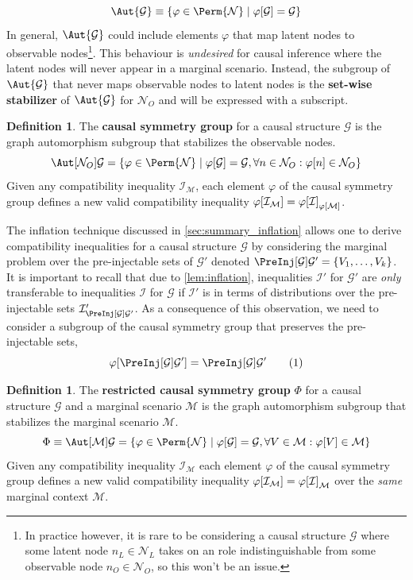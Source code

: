 \documentclass[aps, 10pt, english, twoside, pra, nofootinbib, longbibliography]{revtex4-1}
\theoremstyle{plain}
\theoremstyle{definition}
\newtheorem{definition}[theorem]{Definition}
\theoremstyle{remark}
\newcommand{\graph}{\mathcal{G}}
\newcommand{\nodes}{\mathcal{N}}
\newcommand{\gelem}{\varphi}
\newcommand{\action}[1]{\gelem\bs{#1}}
\newcommand{\mscenario}{\mathcal{M}}
\newcommand{\term}[1]{\textcolor{Mahogany}{\textbf{#1}}}
\begin{document}
    \[ \Aut{\graph} \defined \bc{\gelem \in \Perm{\nodes} \mid \action{\graph} = \graph} \]
    In general, $\Aut{\graph}$ could include elements $\gelem$ that map latent nodes to observable nodes\footnote{In practice however, it is rare to be considering a causal structure $\graph$ where some latent node $n_L \in \nodes_L$ takes on an role indistinguishable from some observable node $n_O \in \nodes_O$, so this won't be an issue.}. This behaviour is \textit{undesired} for causal inference where the latent nodes will never appear in a marginal scenario. Instead, the subgroup of $\Aut{\graph}$ that never maps observable nodes to latent nodes is the \term{set-wise stabilizer} of $\Aut{\graph}$ for $\nodes_O$ and will be expressed with a subscript.

    \begin{definition}
        The \term{causal symmetry group} for a causal structure $\graph$ is the graph automorphism subgroup that stabilizes the observable nodes.
        \[ \Aut[\nodes_O]{\graph} = \bc{\gelem \in \Perm{\nodes} \mid \action{\graph} = \graph, \forall n \in \nodes_O :\action{n} \in \nodes_O} \]
        Given any compatibility inequality $\mathcal{I}_{\mscenario}$, each element $\gelem$ of the causal symmetry group defines a new valid compatibility inequality $\action{\mathcal{I}_{\mscenario}} = \action{\mathcal{I}}_{\action{\mscenario}}$.
    \end{definition}

    The inflation technique discussed in \cref{sec:summary_inflation} allows one to derive compatibility inequalities for a causal structure $\graph$ by considering the marginal problem over the pre-injectable sets of $\graph'$ denoted $\PreInj[\graph]{\graph'} = \bc{V_1, \ldots, V_k}$. It is important to recall that due to \cref{lem:inflation}, inequalities $\mathcal{I}'$ for $\graph'$ are \textit{only} transferable to inequalities $\mathcal{I}$ for $\graph$ if $\mathcal{I}'$ is in terms of distributions over the pre-injectable sets $\mathcal{I}'_{\PreInj[\graph]{\graph'}}$. As a consequence of this observation, we need to consider a subgroup of the causal symmetry group that preserves the pre-injectable sets,
    \[ \action{\PreInj[\graph]{\graph'}} = \PreInj[\graph]{\graph'} \eq \label{eq:preserved_preinj} \]

    \begin{definition}
        The \term{restricted causal symmetry group} $\Phi$ for a causal structure $\graph$ and a marginal scenario $\mscenario$ is the graph automorphism subgroup that stabilizes the marginal scenario $\mscenario$.
        \[ \Phi \defined \Aut[\mscenario]{\graph} = \bc{\gelem \in \Perm{\nodes} \mid \action{\graph} = \graph, \forall V \in \mscenario : \action{V} \in \mscenario} \]
        Given any compatibility inequality $\mathcal{I}_{\mscenario}$ each element $\gelem$ of the causal symmetry group defines a new valid compatibility inequality $\action{\mathcal{I}_{\mscenario}} = \action{\mathcal{I}}_{\mscenario}$ over the \textit{same} marginal context $\mscenario$.
    \end{definition}
\end{document}
